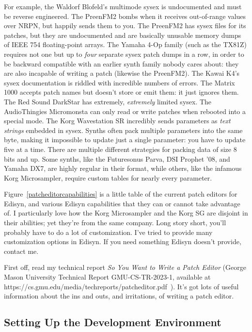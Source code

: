 \documentclass{article}
\begin{document}
For example, the Waldorf Blofeld's multimode sysex is undocumented and must be reverse engineered.  The PreenFM2 bombs when it receives out-of-range values over NRPN, but happily sends them to you.  The PreenFM2 has sysex files for its patches, but they are undocumented and are basically unusable memory dumps  of IEEE 754 floating-point arrays.  The Yamaha 4-Op family (such as the TX81Z) requires not one but up to {\it four} separate sysex patch dumps in a row, in order to be backward compatible with an earlier synth family nobody cares about: they are also incapable of writing a patch (likewise the PreenFM2).    The Kawai K4's sysex documentation is riddled with incredible numbers of errors.    The Matrix 1000 accepts patch names but doesn't store or emit them: it just ignores them.  The Red Sound DarkStar has extremely, {\it extremely} limited sysex.  The  AudioThingies Micromonsta can only read or write patches when rebooted into a special mode.  The Korg Wavestation SR incredibly sends parameters as {\it text strings} embedded in sysex.  Synths often pack multiple parameters into the same byte, making it impossible to update just a single parameter: you have to update five at a time.  There are multiple different strategies for packing data of size 8 bits and up.  Some synths, like the Futuresonus Parva, DSI Prophet '08, and Yamaha DX7, are highly regular in their format, while others, like the infamous Korg Microsampler, require custom tables for nearly every parameter.

Figure~\ref{patcheditorcapabilities} is a little table of the current patch editors for Edisyn, and various Edisyn capabilities that they can or cannot take advantage of.  I particularly love how the Korg Microsampler and the Korg SG are disjoint in their abilities; yet they're from the same company.   Long story short, you'll probably have to do a lot of customization.  I've tried to provide many customization options in Edisyn.  If you need something Edisyn doesn't provide, contact me.

First off, read my technical report {\it So You Want to Write a Patch Editor} (George Mason University Technical Report GMU-CS-TR-2023-1, available at https:/\!/cs.gmu.edu/media/techreports/patcheditor.pdf~).  It's got lots of useful information about the ins and outs, and irritations, of writing a patch editor.


\subsection{Setting Up the Development Environment}
\end{document}
